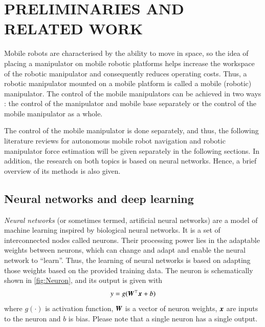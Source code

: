 \chapter{PRELIMINARIES AND RELATED WORK}
\label{chap:Literature}
    
Mobile robots are characterised by the ability to move in space, so the idea of placing a manipulator on mobile robotic platforms helps increase the workspace of the robotic manipulator and consequently reduces operating costs. Thus, a robotic manipulator mounted on a mobile platform is called a mobile (robotic) manipulator. The control of the mobile manipulators can be achieved in two ways \cite{Nassal1994}: the control of the manipulator and mobile base separately or the control of the mobile manipulator as a whole.

The control of the mobile manipulator is done separately, and thus, the following literature reviews for autonomous mobile robot navigation and robotic manipulator force estimation will be given separately in the following sections. In addition, the research on both topics is based on neural networks. Hence, a brief overview of its methods is also given.

\section{Neural networks and deep learning}

\emph{Neural networks} (or sometimes termed, artificial neural networks) are a model of machine learning inspired by biological neural networks. It is a set of interconnected nodes called neurons. Their processing power lies in the adaptable weights between neurons, which can change and adapt and enable the neural network to ``learn''. Thus, the learning of neural networks is based on adapting those weights based on the provided training data. The neuron is schematically shown in \cref{fig:Neuron}, and its output is given with
\[
    y = g({\bm{W}}^{\top}{\bm{x}} + b)
    \label{eq:Neuron}
\]
where $g(\cdot)$ is activation function, ${\bm{W}}$ is a vector of neuron weights, ${\bm{x}}$ are inputs to the neuron and $b$ is bias. Please note that a single neuron has a single output.

